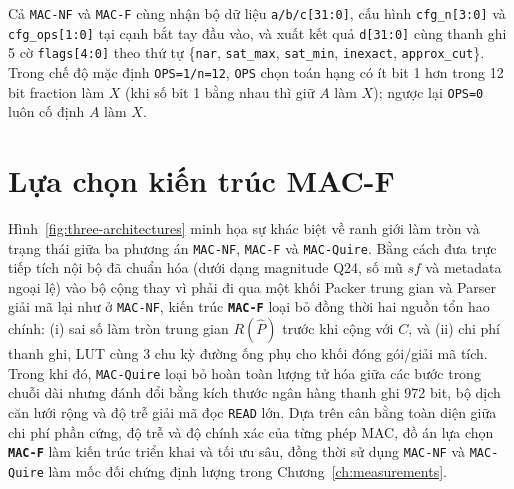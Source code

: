 Cả \texttt{MAC-NF} và \texttt{MAC-F} cùng nhận bộ dữ liệu \texttt{a/b/c[31:0]},
cấu hình \texttt{cfg\_n[3:0]} và \texttt{cfg\_ops[1:0]} tại cạnh bắt tay đầu vào,
và xuất kết quả \texttt{d[31:0]} cùng thanh ghi 5 cờ \texttt{flags[4:0]} theo thứ
tự \{\texttt{nar}, \texttt{sat\_max}, \texttt{sat\_min}, \texttt{inexact},
\texttt{approx\_cut}\}. Trong chế độ mặc định \texttt{OPS=1/n=12}, \texttt{OPS}
chọn toán hạng có ít bit 1 hơn trong 12 bit fraction làm $X$ (khi số bit 1 bằng
nhau thì giữ $A$ làm $X$); ngược lại \texttt{OPS=0} luôn cố định $A$ làm $X$.



\section{Lựa chọn kiến trúc MAC-F}

Hình~\ref{fig:three-architectures} minh họa sự khác biệt về ranh giới làm tròn và
trạng thái giữa ba phương án \texttt{MAC-NF}, \texttt{MAC-F} và \texttt{MAC-Quire}.
Bằng cách đưa trực tiếp tích nội bộ đã chuẩn hóa (dưới dạng magnitude Q24, số mũ
$sf$ và metadata ngoại lệ) vào bộ cộng thay vì phải đi qua một khối Packer trung gian
và Parser giải mã lại như ở \texttt{MAC-NF}, kiến trúc \textbf{\texttt{MAC-F}} loại
bỏ đồng thời hai nguồn tổn hao chính: (i) sai số làm tròn trung gian $R(\widehat P)$
trước khi cộng với $C$, và (ii) chi phí thanh ghi, LUT cùng 3 chu kỳ đường ống phụ
cho khối đóng gói/giải mã tích. Trong khi đó, \texttt{MAC-Quire} loại bỏ hoàn toàn
lượng tử hóa giữa các bước trong chuỗi dài nhưng đánh đổi bằng kích thước ngân
hàng thanh ghi 972 bit, bộ dịch căn lưới rộng và độ trễ giải mã đọc \texttt{READ}
lớn. Dựa trên cân bằng toàn diện giữa chi phí phần cứng, độ trễ và độ chính xác
của từng phép MAC, đồ án lựa chọn \textbf{\texttt{MAC-F}} làm kiến trúc triển khai
và tối ưu sâu, đồng thời sử dụng \texttt{MAC-NF} và \texttt{MAC-Quire} làm mốc
đối chứng định lượng trong Chương~\ref{ch:measurements}.

